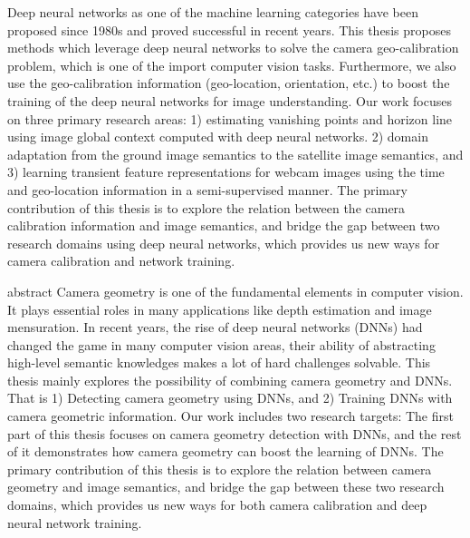 Deep neural networks as one of the machine learning categories have been proposed
since 1980s and proved successful in recent years. This thesis proposes methods which
leverage deep neural networks to solve the camera geo-calibration problem, which is
one of the import computer vision tasks. Furthermore, we also use the geo-calibration
information (geo-location, orientation, etc.) to boost the training of the deep neural
networks for image understanding.
Our work focuses on three primary research areas: 1) estimating vanishing points
and horizon line using image global context computed with deep neural networks. 2)
domain adaptation from the ground image semantics to the satellite image semantics,
and 3) learning transient feature representations for webcam images using the time
and geo-location information in a semi-supervised manner.
The primary contribution of this thesis is to explore the relation between the
camera calibration information and image semantics, and bridge the gap between
two research domains using deep neural networks, which provides us new ways for
camera calibration and network training.


abstract
Camera geometry is one of the fundamental elements in computer vision.
It plays essential roles in many applications like depth estimation
and image mensuration.
%
In recent years, the rise of deep neural networks (DNNs) had changed
the game in many computer vision areas, their ability of abstracting
high-level semantic knowledges makes a lot of hard challenges
solvable.
%
This thesis mainly explores the possibility of combining camera
geometry and DNNs. That is 1) Detecting camera geometry using DNNs,
and 2) Training DNNs with camera geometric information.  Our work
includes two research targets: The first part of this thesis focuses
on camera geometry detection with DNNs, and the rest of it
demonstrates how camera geometry can boost the learning of DNNs.
%
The primary contribution of this thesis is to explore the relation
between camera geometry and image semantics, and bridge the gap
between these two research domains, which provides us new ways for
both camera calibration and deep neural network training.

